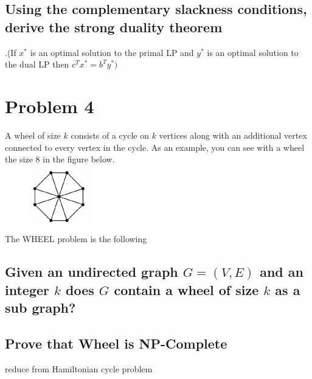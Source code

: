 \documentclass[]{article}
\begin{document}
\subsection{Using the complementary slackness conditions, derive the strong duality theorem}.(If $x^*$ is an optimal solution to the primal LP and $y^*$ is an optimal solution to the dual LP then $c^Tx^* = b^Ty^*)$
\section{Problem 4}
A wheel of size $k$ consists of a cycle on $k$ vertices along with an additional vertex connected to every vertex in the cycle. As an example, you can see with a wheel the size 8 in the figure below. \\
\includegraphics{8k}\\
The WHEEL problem is the
following
\subsection{Given an undirected graph $G = (V,E) $ and an integer $k$ does $G$ contain a wheel of size $k$ as a sub graph?}
\subsection{Prove that Wheel is NP-Complete}
reduce from Hamiltonian cycle problem
\end{document}
